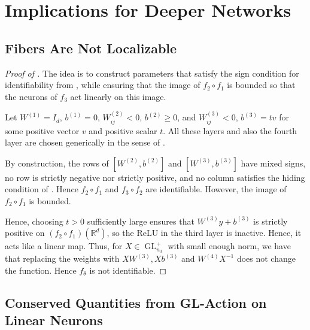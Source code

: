 \documentclass{article}
\theoremstyle{definition}
\newcommand{\R}{\mathbb{R}}
\newcommand{\weights}[1]{W^{(#1)}}
\newcommand{\bias}[1]{b^{(#1)}}
\DeclareMathOperator{\GL}{GL}
\begin{document}
\section{Implications for Deeper Networks}

\subsection{Fibers Are Not Localizable}

\proplocalizable* 

\begin{proof}[Proof of ] 
The idea is to construct parameters that satisfy the sign condition for identifiability from , while ensuring that the image of $f_2 \circ f_1$ is bounded so that the neurons of $f_3$ act linearly on this image. 

Let $\weights{1} = I_d$, $b^{(1)} = 0$, $\weights{2}_{ij} <0$, $\bias{2}\geq 0$, and $\weights{3}_{ij} <0$, $\bias{3} = t v$ for some positive vector $v$ and positive scalar $t$. 
All these layers and also the fourth layer are chosen generically in the sense of . 

By construction, the rows of $[\weights{2},b^{(2)}]$ and $[W^{(3)},b^{(3)}]$ have mixed signs, no row is strictly negative nor strictly positive, and no column satisfies the hiding condition of . 
Hence $f_2 \circ f_1$ and $f_3 \circ f_2$ are identifiable. However, the image of $f_2 \circ f_1$ is bounded.

Hence, choosing $t>0$ sufficiently large ensures that $W^{(3)}y+b^{(3)}$ is strictly positive on $(f_2 \circ f_1)(\R^d)$, so the ReLU in the third layer is inactive. Hence, it acts like a linear map. Thus, for $X \in \GL^+_{n_3}$ with small enough norm, we have that replacing the weights with $X\weights{3},X\bias{3}$ and $\weights{4}X^{-1}$ does not change the function. Hence $f_\theta$ is not identifiable. 
\end{proof}



\subsection{Conserved Quantities from GL-Action on Linear Neurons}
\label{subsec:conserved_quantities}
\end{document}
